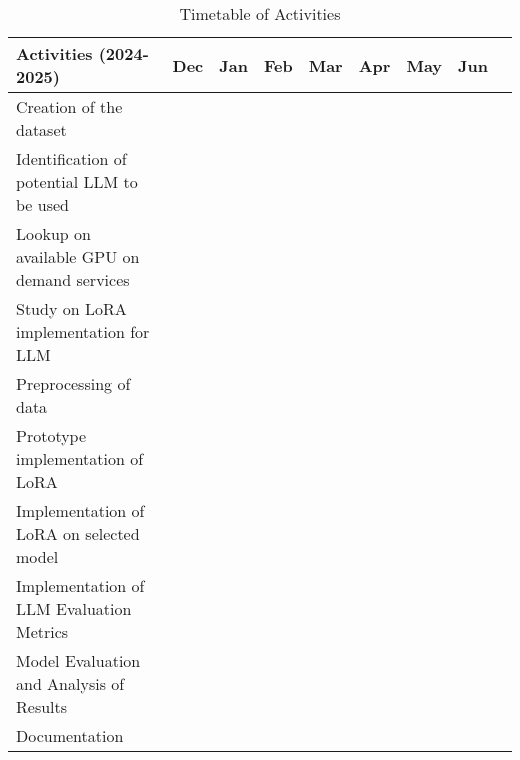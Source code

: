 	
	\begin{table}[ht]  
		\centering
		\caption{Timetable of Activities} \vspace{0.25em}
		\begin{tabular}{|p{2in}|c|c|c|c|c|c|c|c|} \hline
			\centering Activities (2024-2025) 
			& Dec & Jan & Feb & Mar & Apr & May & Jun \\ \hline
			
			Creation of the dataset      
			&\weekone~~~ & & & & & &  \\ \hline
			
			Identification of potential LLM to be used 
			&\weekone~~~ & & & &  &  &  \\ \hline
			
			Lookup on available GPU on demand services     
			&\weekone~~~ & & & &  & &   \\ \hline
			
			Study on LoRA implementation for LLM     
			& ~\weekone & & & &  &  &  \\ \hline
			
			Preprocessing of data      
			& ~\weekthree & & & &  & &  \\ \hline
			
			Prototype implementation of LoRA 
			&~~~\weekone & \weekfour & & &  & &   \\ \hline
			
			Implementation of LoRA on selected model 
			& & &\weektwo~~ & &  &  &  \\ \hline
			
			Implementation of LLM Evaluation Metrics 
			& & &\weektwo  & &  &  &  \\ \hline
			
			Model Evaluation and Analysis of Results 
			& & & & \weekfour & &  &   \\ \hline
			
			Documentation 
			& ~~\weektwo  & \weekfour & \weekfour & \weekfour & \weekfour & &  \\ \hline
			
		\end{tabular}
		\label{tab:timetableactivities}
	\end{table}
